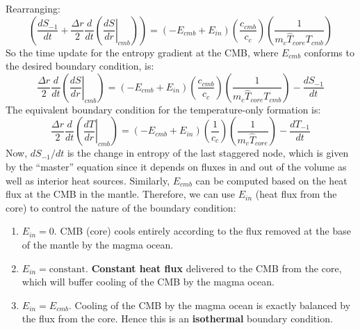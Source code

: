 Rearranging:
\begin{equation}
\left( \frac{dS_{-1}}{dt} + \frac{\Delta r}{2} \frac{d}{dt} \left( \left. \frac{dS}{dr} \right |_{cmb} \right)  \right) = (-E_{cmb}+E_{in}) \left( \frac{c_{cmb}}{c_c} \right) \left( \frac{1}{m_c \hat{T}_{core} T_{cmb}} \right)
\end{equation}
So the time update for the entropy gradient at the CMB, where $E_{cmb}$ conforms to the desired boundary condition, is:
\begin{equation}
\frac{\Delta r}{2} \frac{d}{dt} \left( \left. \frac{dS}{dr} \right |_{cmb} \right) = (-E_{cmb}+E_{in}) \left( \frac{c_{cmb}}{c_c} \right) \left( \frac{1}{m_c \hat{T}_{core} T_{cmb}} \right) - \frac{dS_{-1}}{dt}
\end{equation}
The equivalent boundary condition for the temperature-only formation is:
\begin{equation}
\frac{\Delta r}{2} \frac{d}{dt} \left( \left. \frac{dT}{dr} \right |_{cmb} \right) = (-E_{cmb}+E_{in}) \left(\frac{1}{c_c} \right) \left( \frac{1}{m_c \hat{T}_{core}} \right) - \frac{dT_{-1}}{dt}
\end{equation}
Now, $dS_{-1}/dt$ is the change in entropy of the last staggered node, which is given by the ``master'' equation since it depends on fluxes in and out of the volume as well as interior heat sources.  Similarly, $E_{cmb}$ can be computed based on the heat flux at the CMB in the mantle.  Therefore, we can use $E_{in}$ (heat flux from the core) to control the nature of the boundary condition:
\begin{enumerate}
\item $E_{in}=0$.  CMB (core) cools entirely according to the flux removed at the base of the mantle by the magma ocean.
\item $E_{in}=\text{constant}$.  \textbf{Constant heat flux} delivered to the CMB from the core, which will buffer cooling of the CMB by the magma ocean.
\item $E_{in}=E_{cmb}$.  Cooling of the CMB by the magma ocean is exactly balanced by the flux from the core.  Hence this is an \textbf{isothermal} boundary condition.
\end{enumerate}
